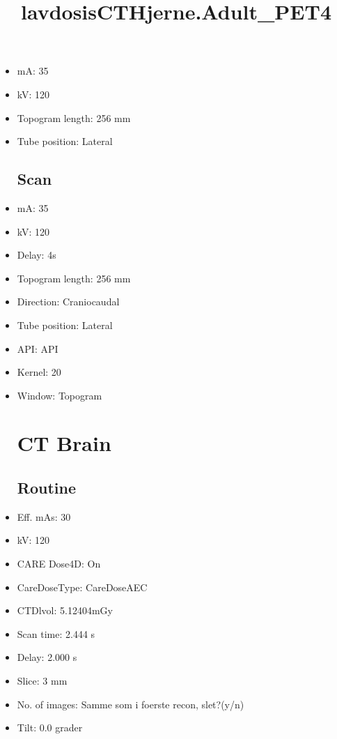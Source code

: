 \documentclass[12pt]{article}
\title{lavdosisCTHjerne.Adult\_PET4}
\begin{document}
\maketitle
\newpage
\tableofcontents
\newpage
{}


\begin{itemize}[noitemsep]\section{Topogram}
\subsection{Routine}
\item mA: 35\item kV: 120\item Topogram length: 256 mm\item Tube position: Lateral
\subsection{Scan}\item mA: 35\item kV: 120\item Delay: 4s\item Topogram length: 256 mm\item Direction: Craniocaudal\item Tube position: Lateral\item API: API \item Kernel: 20\item Window: Topogram
\section{CT Brain}
\subsection{Routine}
\item Eff. mAs: 30\item kV: 120\item CARE Dose4D: On\item CareDoseType: CareDoseAEC\item CTDlvol: 5.12404mGy\item Scan time: 2.444 s\item Delay: 2.000 s\item Slice: 3 mm\item No. of images: Samme som i foerste recon, slet?(y/n)\item Tilt: 0.0 grader

\end{itemize}
\end{document}
